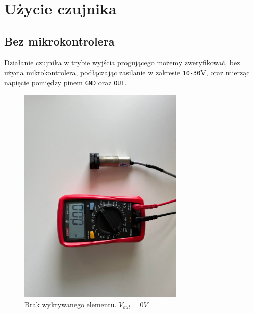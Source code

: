 \documentclass[11pt, a4paper]{article}
\begin{document}
\newpage

\section{Użycie czujnika}
\subsection{Bez mikrokontrolera}

Działanie czujnika w trybie wyjścia progującego możemy zweryfikować, bez użycia mikrokontrolera, podłączając zasilanie w zakresie \texttt{10-30}V, oraz mierząc napięcie pomiędzy pinem \texttt{GND} oraz \texttt{OUT}.

\begin{figure}[h!]
    \centering
    \includegraphics[angle=-90, width=0.7\textwidth]{fig/SCOO/stnd1-off.jpg}
    \caption{Brak wykrywanego elementu. $V_{out} = 0V$}
\end{figure}
\end{document}
